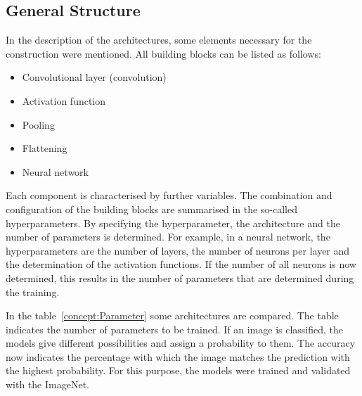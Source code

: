 {%

\subsection{General Structure}



In the description of the architectures, some elements necessary for the construction were mentioned. All building blocks can be listed as follows:

\begin{itemize}
	\item Convolutional layer (convolution)
	\item Activation function
	\item Pooling
	\item Flattening
	\item Neural network
\end{itemize}

Each component is characterised by further variables. The combination and configuration of the building blocks are summarised in the so-called hyperparameters. By specifying the hyperparameter, the architecture and the number of parameters is determined. For example, in a neural network, the hyperparameters are the number of layers, the number of neurons per layer and the determination of the activation functions. If the number of all neurons is now determined, this results in the number of parameters that are determined during the training.

In the table~\ref{concept:Parameter} some architectures are compared. The table indicates the number of parameters to be trained.  If an image is classified, the models give different possibilities and assign a probability to them. The accuracy now indicates the percentage with which the image matches the prediction with the highest probability. For this purpose, the models were trained and validated with the ImageNet. 




}
